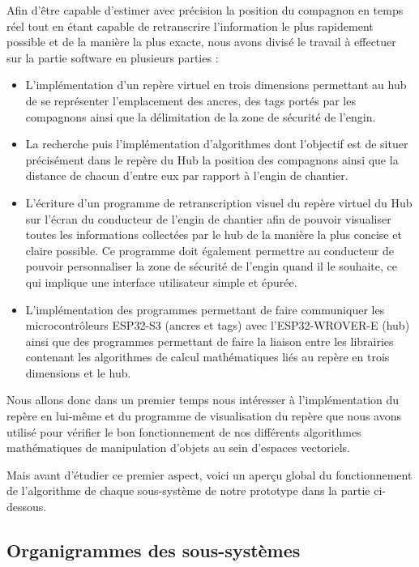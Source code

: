 
Afin d'être capable d'estimer avec précision la position du compagnon en temps réel tout en étant capable de retranscrire l'information le plus rapidement possible et de la manière la plus exacte, nous avons divisé le travail à effectuer sur la partie software en plusieurs parties :

\begin{itemize}
    \item L'implémentation d'un repère virtuel en trois dimensions permettant au hub de se représenter l'emplacement des ancres, des tags portés par les compagnons ainsi que la délimitation de la zone de sécurité de l'engin.
    \item La recherche puis l'implémentation d'algorithmes dont l'objectif est de situer précisément dans le repère du Hub la position des compagnons ainsi que la distance de chacun d'entre eux par rapport à l'engin de chantier.
    \item L'écriture d'un programme de retranscription visuel du repère virtuel du Hub sur l'écran du conducteur de l'engin de chantier afin de pouvoir visualiser toutes les informations collectées par le hub de la manière la plus concise et claire possible. Ce programme doit également permettre au conducteur de pouvoir personnaliser la zone de sécurité de l'engin quand il le souhaite, ce qui implique une interface utilisateur simple et épurée.
    \item L'implémentation des programmes permettant de faire communiquer les microcontrôleurs ESP32-S3 (ancres et tags) avec l'ESP32-WROVER-E (hub) ainsi que des programmes permettant de faire la liaison entre les librairies contenant les algorithmes de calcul mathématiques liés au repère en trois dimensions et le hub.
\end{itemize}
\bigskip %
Nous allons donc dans un premier temps nous intéresser à l'implémentation du repère en lui-même et du programme de visualisation du repère que nous avons utilisé pour vérifier le bon fonctionnement de nos différents algorithmes mathématiques de manipulation d'objets au sein d'espaces vectoriels.

Mais avant d'étudier ce premier aspect, voici un aperçu global du fonctionnement de l'algorithme de chaque sous-système de notre prototype dans la partie ci-dessous.
\newpage
\subsection{Organigrammes des sous-systèmes}

